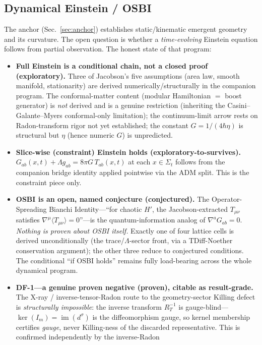 \documentclass[aps,pra,twocolumn,superscriptaddress,floatfix]{revtex4-2}
\theoremstyle{definition}
\begin{document}
\subsection{Dynamical Einstein / OSBI}

The anchor (Sec.~\ref{sec:anchor}) establishes static/kinematic emergent
geometry and its curvature. The open question is whether a \emph{time-evolving}
Einstein equation follows from partial observation. The honest state of that
program:

\begin{itemize}
\item \textbf{Full Einstein is a conditional chain, not a closed proof
(exploratory).} Three of Jacobson's five assumptions (area law, smooth manifold,
stationarity) are derived numerically/structurally in the companion program. The
conformal-matter content (modular Hamiltonian $=$ boost generator) is
\emph{not} derived and is a genuine restriction (inheriting the
Casini--Galante--Myers conformal-only limitation); the continuum-limit arrow
rests on Radon-transform rigor not yet established; the constant
$G=1/(4\hbar\eta)$ is structural but $\eta$ (hence numeric $G$) is unpredicted.
\item \textbf{Slice-wise (constraint) Einstein holds (exploratory-to-survives).}
$G_{ab}(x,t)+\Lambda g_{ab}=8\pi G\,T_{ab}(x,t)$ at each $x\in\Sigma_t$ follows
from the companion bridge identity applied pointwise via the ADM split. This is
the constraint piece only.
\item \textbf{OSBI is an open, named conjecture (conjectured).} The
Operator-Spreading Bianchi Identity---``for chaotic $H'$, the Jacobson-extracted
$T_{\mu\nu}$ satisfies $\nabla^\mu\langle T_{\mu\nu}\rangle=0$''---is the
quantum-information analog of $\nabla^a G_{ab}=0$. \emph{Nothing is proven about
OSBI itself.} Exactly one of four lattice cells is derived unconditionally (the
trace/$\Lambda$-sector front, via a TDiff-Noether conservation argument); the
other three reduce to conjectured conditions. The conditional ``if OSBI holds''
remains fully load-bearing across the whole dynamical program.
\item \textbf{DF-1---a genuine proven negative (proven), citable as
result-grade.} The X-ray / inverse-tensor-Radon route to the geometry-sector
Killing defect is \emph{structurally impossible}: the inverse transform $R_T^{-1}$
is gauge-blind---$\ker(I_m)=\operatorname{im}(d^\sigma)$ is the diffeomorphism
gauge, so kernel membership certifies \emph{gauge}, never Killing-ness of the
discarded representative. This is confirmed independently by the inverse-Radon

\end{itemize}
\end{document}
